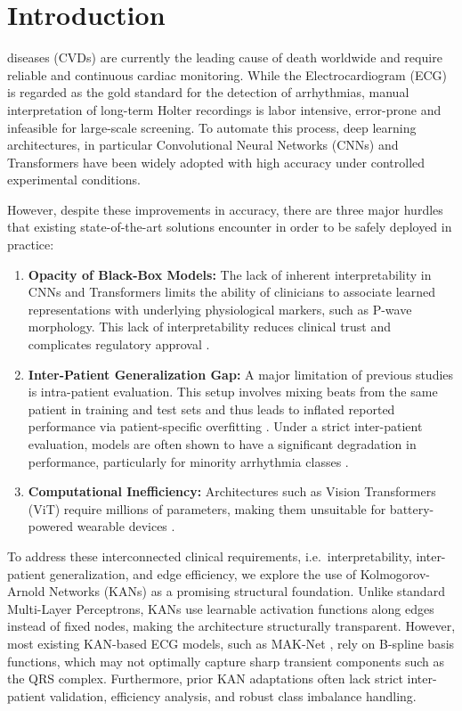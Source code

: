 \documentclass[journal]{IEEEtran}
\begin{document}
\section{Introduction}

 diseases (CVDs) are currently the leading cause of death worldwide and require reliable and continuous cardiac monitoring. While the Electrocardiogram (ECG) is regarded as the gold standard for the detection of arrhythmias, manual interpretation of long-term Holter recordings is labor intensive, error-prone and infeasible for large-scale screening. To automate this process, deep learning architectures, in particular Convolutional Neural Networks (CNNs) \cite{takalo-mattila_inter-patient_2018, guo_inter-patient_2019} and Transformers \cite{akan_ecgformer_2024} have been widely adopted with high accuracy under controlled experimental conditions.

However, despite these improvements in accuracy, there are three major hurdles that existing state-of-the-art solutions encounter in order to be safely deployed in practice: 

\begin{enumerate}
    \item \textbf{Opacity of Black-Box Models:} The lack of inherent interpretability in CNNs and Transformers limits the ability of clinicians to associate learned representations with underlying physiological markers, such as P-wave morphology. This lack of interpretability reduces clinical trust and complicates regulatory approval \cite{taleban_explainable_2026}. 
    \item \textbf{Inter-Patient Generalization Gap:} A major limitation of previous studies is intra-patient evaluation. This setup involves mixing beats from the same patient in training and test sets and thus leads to inflated reported performance via patient-specific overfitting \cite{bahrami_investigation_2025}. Under a strict inter-patient evaluation, models are often shown to have a significant degradation in performance, particularly for minority arrhythmia classes \cite{xiao_deep_2023, silva_systematic_2025}.
    \item \textbf{Computational Inefficiency:} Architectures such as Vision Transformers (ViT) require millions of parameters, making them unsuitable for battery-powered wearable devices \cite{elsheikhy_lightweight_2025}.
\end{enumerate}

To address these interconnected clinical requirements, i.e.\ interpretability, inter-patient generalization, and edge efficiency, we explore the use of Kolmogorov-Arnold Networks (KANs) \cite{liu_kan_2024} as a promising structural foundation. Unlike standard Multi-Layer Perceptrons, KANs use learnable activation functions along edges instead of fixed nodes, making the architecture structurally transparent. However, most existing KAN-based ECG models, such as MAK-Net \cite{zhao_mak-net_2025}, rely on B-spline basis functions, which may not optimally capture sharp transient components such as the QRS complex. Furthermore, prior KAN adaptations often lack strict inter-patient validation, efficiency analysis, and robust class imbalance handling.
\end{document}
